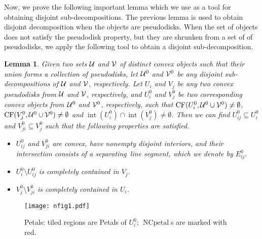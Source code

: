 \documentclass[a4paper,11pt]{article}
\DeclareMathOperator{\interior}{int}
\DeclareMathOperator{\NCpetal}{NCpetal}
\DeclareMathOperator{\CF}{CF}
\newtheorem{lemma}{Lemma}
\begin{document}
Now, we prove the following important lemma which we use as a tool for obtaining disjoint sub-decompositions. The previous lemma is used to obtain disjoint decomposition when the objects are pseudodisks.  When the set of objects does not satisfy the pseudodisk property, but they are shrunken  from a set of of pseudodisks, we apply the following tool to obtain a disjoint sub-decomposition.

\begin{lemma} \label{petalLemma}
Given two sets ${\cal U}$ and ${\cal V}$ of distinct convex objects such that their union forms a 
collection  of pseudodisks,  let 
${{\cal U}^0}$ and ${{\cal V}^0}$ be any disjoint sub-decompositions of ${\cal U}$ and ${\cal V}$, respectively.
Let $U_i$ and $V_j$ be any two convex  pseudodisks from ${\cal U}$ and ${\cal V}$, respectively, and ${U^0_i}$ 
and ${V^0_j}$ be 
two corresponding convex objects  from  ${{\cal U}^0}$ and ${{\cal V}^0}$, respectively,   such that $\CF({U^0_i}, {{\cal U}^0}\cup {{\cal V}^0})\neq \emptyset$, 
$\CF({V^0_j}, {{\cal U}^0}\cup {{\cal V}^0})\neq \emptyset$ and 
$\interior({U^0_i})\cap 
\interior({V^0_j})\neq 
\emptyset$. Then we can find ${U^0_{ij}}\subseteq {U^0_i}$ 
and 
${V^0_{ji}}\subseteq {V^0_j}$ such that the following 
properties are 
satisfied.

\begin{itemize}

 \item[(i)] ${U^0_{ij}}$ and ${V^0_{ji}}$ are convex,  have nonempty disjoint interiors, and their intersection consists of a separating~line segment, which we denote by $E^0_{ij}$.

\item[(ii)] ${U^0_i}\setminus {U^0_{ij}}$ is completely 
contained in 
$V_j$.
\item[(iii)] ${V^0_j}\setminus {V^0_{ji}}$ is completely 
contained in $U_i$.
\end{itemize}

\end{lemma}
\begin{figure}
 
    \centering

  \texttt{[image: nfig1.pdf]}
   \caption{Petals: tiled regions are Petals of $U_i^0$; $\NCpetal$s are marked with red.}
   \label{figPetals}
\end{figure}
\end{document}
